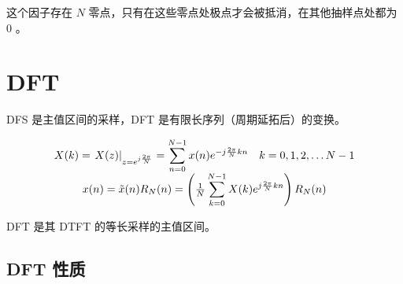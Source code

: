 \documentclass[cn,11pt,chinese,black,simple]{elegantbook}
\begin{document}
这个因子存在 \(N\) 零点，只有在这些零点处极点才会被抵消，在其他抽样点处都为 \(0\) 。

\section{DFT} 

DFS 是主值区间的采样，DFT 是有限长序列（周期延拓后）的变换。

\[
\begin{array}{c}
X(k)=\left.X(z)\right|_{z=e^{j \frac{2 \pi}{N}}}=\displaystyle\sum_{n=0}^{N-1} x(n) e^{-j \frac{2 \pi}{N} k n} \quad k=0,1,2, \ldots N-1 \\
x(n)=\tilde{x}(n) R_{N}(n)=\left(\frac{1}{N} \displaystyle\sum_{k=0}^{N-1} X(k) e^{j \frac{2 \pi}{N} k n}\right) R_{N}(n)
\end{array}
\]

DFT 是其 DTFT 的等长采样的主值区间。

\subsection{DFT 性质}
\end{document}
